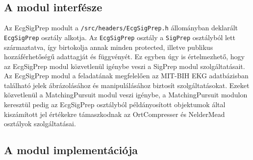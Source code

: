 \documentclass[oneside,titlepage,12pt,a4paper]{report}
\begin{document}
\subsection*{A modul interfésze}

\par Az EcgSigPrep modult a \texttt{/src/headers/EcgSigPrep.h} állományban deklarált \texttt{EcgSigPrep} osztály alkotja. Az \texttt{EcgSigPrep} osztály a \texttt{SigPrep} osztályból lett származtatva, így birtokolja annak minden protected, illetve publikus hozzáférhetőségű adattagját és függvényét. Ez egyben úgy is értelmezhető, hogy az EcgSigPrep modul közvetlenül igénybe veszi a SigPrep modul szolgáltatásait. Az EcgSigPrep modul a feladatának megfelelően az MIT-BIH EKG adatbázisban található jelek ábrázolásához és manipulálásához biztosít szolgáltatásokat. Ezeket közvetlenül a MatchingPursuit modul veszi igénybe, a MatchingPursuit modulon keresztül pedig az EcgSigPrep osztályból példányosított objektumok által kiszámított jel értékekre támaszkodnak az OrtCompresser és NelderMead osztályok szolgáltatásai. 

\subsection*{A modul implementációja}
\end{document}
